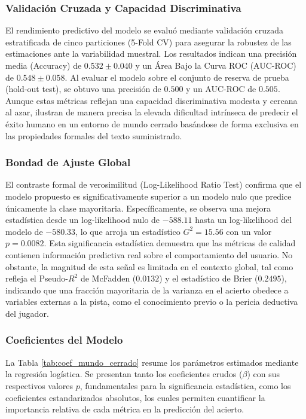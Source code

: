 \subsubsection{Validación Cruzada y Capacidad Discriminativa}

El rendimiento predictivo del modelo se evaluó mediante validación cruzada estratificada de cinco particiones (5-Fold CV) para asegurar la robustez de las estimaciones ante la variabilidad muestral. Los resultados indican una precisión media (Accuracy) de $0.532 \pm 0.040$ y un Área Bajo la Curva ROC (AUC-ROC) de $0.548 \pm 0.058$. Al evaluar el modelo sobre el conjunto de reserva de prueba (hold-out test), se obtuvo una precisión de $0.500$ y un AUC-ROC de $0.505$. Aunque estas métricas reflejan una capacidad discriminativa modesta y cercana al azar, ilustran de manera precisa la elevada dificultad intrínseca de predecir el éxito humano en un entorno de mundo cerrado basándose de forma exclusiva en las propiedades formales del texto suministrado.

\subsubsection{Bondad de Ajuste Global}

El contraste formal de verosimilitud (Log-Likelihood Ratio Test) confirma que el modelo propuesto es significativamente superior a un modelo nulo que predice únicamente la clase mayoritaria. Específicamente, se observa una mejora estadística desde un log-likelihood nulo de $-588.11$ hasta un log-likelihood del modelo de $-580.33$, lo que arroja un estadístico $G^2 = 15.56$ con un valor $p = 0.0082$. Esta significancia estadística demuestra que las métricas de calidad contienen información predictiva real sobre el comportamiento del usuario. No obstante, la magnitud de esta señal es limitada en el contexto global, tal como refleja el Pseudo-$R^2$ de McFadden ($0.0132$) y el estadístico de Brier ($0.2495$), indicando que una fracción mayoritaria de la varianza en el acierto obedece a variables externas a la pista, como el conocimiento previo o la pericia deductiva del jugador.

\subsubsection{Coeficientes del Modelo}

La Tabla \ref{tab:coef_mundo_cerrado} resume los parámetros estimados mediante la regresión logística. Se presentan tanto los coeficientes crudos ($\beta$) con sus respectivos valores $p$, fundamentales para la significancia estadística, como los coeficientes estandarizados absolutos, los cuales permiten cuantificar la importancia relativa de cada métrica en la predicción del acierto.

